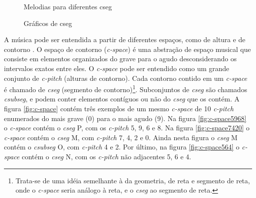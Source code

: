 \documentclass[brazil]{article}
\newcommand{\termo}[1]{\textit{#1}}
\begin{document}
\begin{figure}
  \centering
  \caption{Melodias para diferentes cseg}
  \label{fig:melodias-cseg}
\end{figure}

\begin{figure}
  \centering
  \caption{Gráficos de cseg}
  \label{fig:graficos-cseg}
\end{figure}

A música pode ser entendida a partir de diferentes espaços, como de
altura e de contorno \cite{morris87:composition}. O espaço de contorno
(\termo{c-space}) é uma abstração de espaço musical que consiste em
elementos organizados do grave para o agudo desconsiderando os
intervalos exatos entre eles. O \termo{c-space} pode ser entendido
como um grande conjunto de \termo{c-pitch} (alturas de contorno). Cada
contorno contido em um \termo{c-space} é chamado de \termo{cseg}
(segmento de contorno)\footnote{Trata-se de uma idéia semelhante à da
  geometria, de reta e segmento de reta, onde o \termo{c-space} seria
  análogo à reta, e o \termo{cseg} ao segmento de reta.}. Subconjuntos
de \termo{cseg} são chamados \termo{csubseg}, e podem conter elementos
contíguos ou não do \termo{cseg} que os contém. A figura
\ref{fig:c-space} contém três exemplos de um mesmo \termo{c-space} de
10 \termo{c-pitch} enumerados do mais grave (0) para o mais agudo
(9). Na figura \ref{fig:c-space5968} o \termo{c-space} contém o
\termo{cseg} P, com os \termo{c-pitch} 5, 9, 6 e 8. Na figura
\ref{fig:c-space7420} o \termo{c-space} contém o \termo{cseg} M, com
\termo{c-pitch} 7, 4, 2 e 0. Ainda nesta figura o \termo{cseg} M
contém o \termo{csubseg} O, com \termo{c-pitch} 4 e 2. Por último, na
figura \ref{fig:c-space564} o \termo{c-space} contém o \termo{cseg} N,
com os \termo{c-pitch} não adjacentes 5, 6 e 4.
\end{document}
